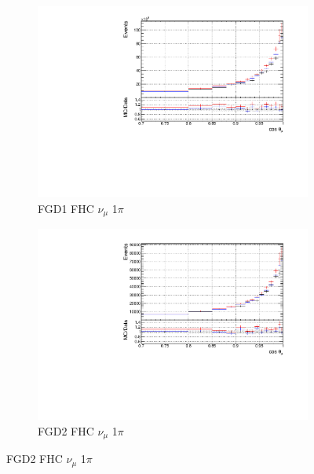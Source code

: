 \begin{figure}[!h]
\begin{subfigure}{0.49\textwidth}
  \centering
  \includegraphics[width=\textwidth]{figs/priorpred1D_t_FGD1_numuCC_1pi}
  \caption{FGD1 FHC $\nu_{\mu}$ 1$\pi$}
\end{subfigure}
\begin{subfigure}{0.49\textwidth}
  \centering
  \includegraphics[width=\textwidth]{figs/priorpred1D_t_FGD2_numuCC_1pi}
  \caption{FGD2 FHC $\nu_{\mu}$ 1$\pi$}
\end{subfigure}


\end{figure}
